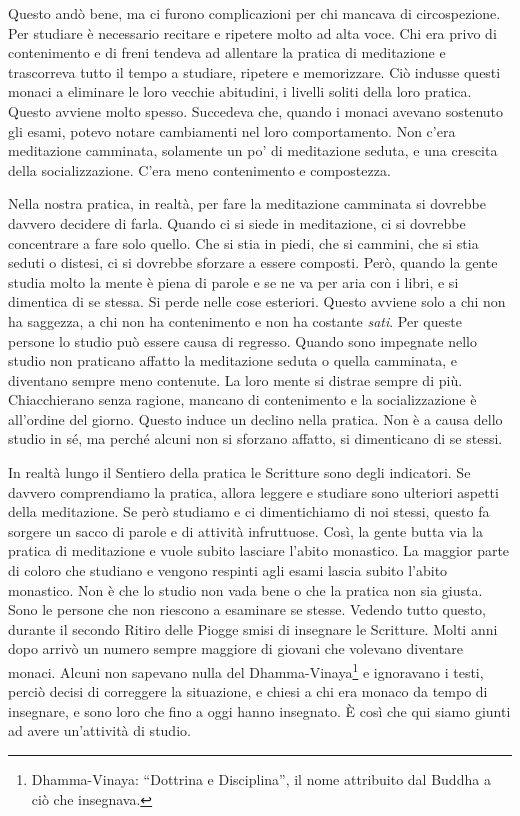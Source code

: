 Questo andò bene, ma ci furono complicazioni per chi mancava di
circospezione. Per studiare è necessario recitare e ripetere molto ad
alta voce. Chi era privo di contenimento e di freni tendeva ad allentare
la pratica di meditazione e trascorreva tutto il tempo a studiare,
ripetere e memorizzare. Ciò indusse questi monaci a eliminare le loro
vecchie abitudini, i livelli soliti della loro pratica. Questo avviene
molto spesso. Succedeva che, quando i monaci avevano sostenuto gli
esami, potevo notare cambiamenti nel loro comportamento. Non c'era
meditazione camminata, solamente un po' di meditazione seduta, e una
crescita della socializzazione. C'era meno contenimento e compostezza.

Nella nostra pratica, in realtà, per fare la meditazione camminata si
dovrebbe davvero decidere di farla. Quando ci si siede in meditazione,
ci si dovrebbe concentrare a fare solo quello. Che si stia in piedi, che
si cammini, che si stia seduti o distesi, ci si dovrebbe sforzare a
essere composti. Però, quando la gente studia molto la mente è piena di
parole e se ne va per aria con i libri, e si dimentica di se stessa. Si
perde nelle cose esteriori. Questo avviene solo a chi non ha saggezza, a
chi non ha contenimento e non ha costante \emph{sati}. Per queste
persone lo studio può essere causa di regresso. Quando sono impegnate
nello studio non praticano affatto la meditazione seduta o quella
camminata, e diventano sempre meno contenute. La loro mente si distrae
sempre di più. Chiacchierano senza ragione, mancano di contenimento e la
socializzazione è all'ordine del giorno. Questo induce un declino nella
pratica. Non è a causa dello studio in sé, ma perché alcuni non si
sforzano affatto, si dimenticano di se stessi.

In realtà lungo il Sentiero della pratica le Scritture sono degli
indicatori. Se davvero comprendiamo la pratica, allora leggere e
studiare sono ulteriori aspetti della meditazione. Se però studiamo e ci
dimentichiamo di noi stessi, questo fa sorgere un sacco di parole e di
attività infruttuose. Così, la gente butta via la pratica di meditazione
e vuole subito lasciare l'abito monastico. La maggior parte di coloro
che studiano e vengono respinti agli esami lascia subito l'abito
monastico. Non è che lo studio non vada bene o che la pratica non sia
giusta. Sono le persone che non riescono a esaminare se stesse. Vedendo
tutto questo, durante il secondo Ritiro delle Piogge smisi di insegnare
le Scritture. Molti anni dopo arrivò un numero sempre maggiore di
giovani che volevano diventare monaci. Alcuni non sapevano nulla del
Dhamma-Vinaya\footnote{Dhamma-Vinaya: ``Dottrina e Disciplina'', il nome
  attribuito dal Buddha a ciò che insegnava.} e ignoravano i testi,
perciò decisi di correggere la situazione, e chiesi a chi era monaco da
tempo di insegnare, e sono loro che fino a oggi hanno insegnato. È così
che qui siamo giunti ad avere un'attività di studio.

